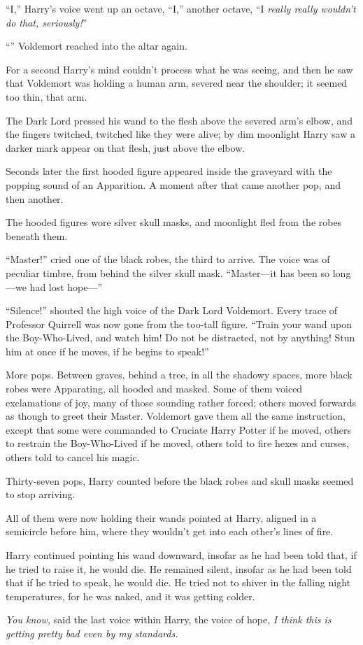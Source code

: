 “I,” Harry’s voice went up an octave,
“I,” another octave,
“I \emph{really really wouldn’t do that, seriously!}”

“” Voldemort reached into the altar again.

For a second Harry’s mind couldn’t process what he was seeing, and then he saw that Voldemort was holding a human arm, severed near the shoulder; it seemed too thin, that arm.

The Dark Lord pressed his wand to the flesh above the severed arm’s elbow, and the fingers twitched, twitched like they were alive; by dim moonlight Harry saw a darker mark appear on that flesh, just above the elbow.

Seconds later the first hooded figure appeared inside the graveyard with the popping sound of an Apparition. A moment after that came another pop, and then another.

The hooded figures wore silver skull masks, and moonlight fled from the robes beneath them.

“Master!” cried one of the black robes, the third to arrive. The voice was of peculiar timbre, from behind the silver skull mask.
“Master—it has been so long—we had lost hope—”

“Silence!” shouted the high voice of the Dark Lord Voldemort. Every trace of Professor Quirrell was now gone from the too-tall figure.
“Train your wand upon the Boy-Who-Lived, and watch him! Do not be distracted, not by anything! Stun him at once if he moves, if he begins to speak!”

More pops. Between graves, behind a tree, in all the shadowy spaces, more black robes were Apparating, all hooded and masked. Some of them voiced exclamations of joy, many of those sounding rather forced; others moved forwards as though to greet their Master. Voldemort gave them all the same instruction, except that some were commanded to Cruciate Harry Potter if he moved, others to restrain the Boy-Who-Lived if he moved, others told to fire hexes and curses, others told to cancel his magic.

Thirty-seven pops, Harry counted before the black robes and skull masks seemed to stop arriving.

All of them were now holding their wands pointed at Harry, aligned in a semicircle before him, where they wouldn’t get into each other’s lines of fire.

Harry continued pointing his wand downward, insofar as he had been told that, if he tried to raise it, he would die. He remained silent, insofar as he had been told that if he tried to speak, he would die. He tried not to shiver in the falling night temperatures, for he was naked, and it was getting colder.

\emph{You know,} said the last voice within Harry, the voice of hope, \emph{I think this is getting pretty bad even by my standards.}


